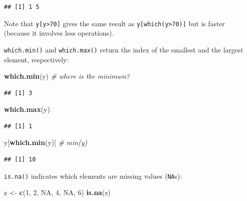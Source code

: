 \documentclass[10pt,b5paper,krantz1]{krantz}
\newenvironment{Shaded}{\begin{snugshade}}{\end{snugshade}}
\newcommand{\CommentTok}[1]{\textcolor[rgb]{0.37,0.37,0.37}{\textit{#1}}}
\newcommand{\DecValTok}[1]{\textcolor[rgb]{0.06,0.06,0.06}{#1}}
\newcommand{\KeywordTok}[1]{\textcolor[rgb]{0.27,0.27,0.27}{\textbf{#1}}}
\newcommand{\NormalTok}[1]{#1}
\newcommand{\OtherTok}[1]{\textcolor[rgb]{0.37,0.37,0.37}{#1}}
\newcommand{\StringTok}[1]{\textcolor[rgb]{0.5,0.5,0.5}{#1}}
\begin{document}
\begin{verbatim}
## [1] 1 5
\end{verbatim}

Note that \texttt{y{[}y\textgreater{}70{]}} gives the same result
as \texttt{y{[}which(y\textgreater{}70){]}} but is faster (because it involves less operations).

\texttt{which.min()} and \texttt{which.max()} return the index of the smallest
and the largest element, respectively:

\begin{Shaded}
\begin{Highlighting}[]
\KeywordTok{which.min}\NormalTok{(y) }\CommentTok{# where is the minimum?}
\end{Highlighting}
\end{Shaded}

\begin{verbatim}
## [1] 3
\end{verbatim}

\begin{Shaded}
\begin{Highlighting}[]
\KeywordTok{which.max}\NormalTok{(y)}
\end{Highlighting}
\end{Shaded}

\begin{verbatim}
## [1] 1
\end{verbatim}

\begin{Shaded}
\begin{Highlighting}[]
\NormalTok{y[}\KeywordTok{which.min}\NormalTok{(y)] }\CommentTok{# min(y)}
\end{Highlighting}
\end{Shaded}

\begin{verbatim}
## [1] 10
\end{verbatim}

\texttt{is.na()} indicates which elements are missing values (\texttt{NA}s):

\begin{Shaded}
\begin{Highlighting}[]
\NormalTok{z <-}\StringTok{ }\KeywordTok{c}\NormalTok{(}\DecValTok{1}\NormalTok{, }\DecValTok{2}\NormalTok{, }\OtherTok{NA}\NormalTok{, }\DecValTok{4}\NormalTok{, }\OtherTok{NA}\NormalTok{, }\DecValTok{6}\NormalTok{)}
\KeywordTok{is.na}\NormalTok{(z)}
\end{Highlighting}
\end{Shaded}
\end{document}
